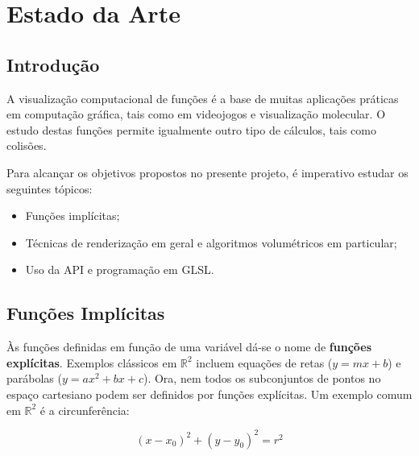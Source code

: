 \chapter{Estado da Arte}
\label{ch::arte}

\section{Introdução}
\label{sec::arte:intro}

A visualização computacional de funções é a base de muitas aplicações práticas em computação gráfica, tais como em videojogos e visualização molecular. O estudo destas funções permite igualmente outro tipo de cálculos, tais como colisões.

Para alcançar os objetivos propostos no presente projeto, é imperativo estudar os seguintes tópicos:

\begin{itemize}
	\item Funções implícitas;
	\item Técnicas de renderização em geral e algoritmos volumétricos em particular;
	\item Uso da \ac{API} \opengl e programação em \ac{GLSL}.
\end{itemize}


\section{Funções Implícitas}
\label{sec::arte:implicitas}



Às funções definidas em função de uma variável dá-se o nome de \textbf{funções explícitas}. Exemplos clássicos em $\mathbb{R}^2$ incluem equações de retas ($y = mx + b$) e parábolas ($y = ax^2 + bx + c$). Ora, nem todos os subconjuntos de pontos no espaço cartesiano podem ser definidos por funções explícitas. Um exemplo comum em $\mathbb{R}^2$ é a circunferência:

\begin{equation}
	(x - x_0)^2 + (y - y_0)^2 = r^2
	\label{eq::circ_implicita}
\end{equation}

